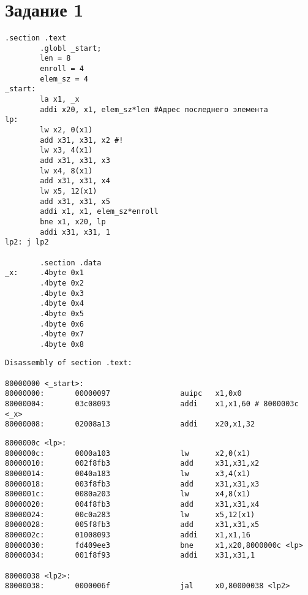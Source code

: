 \chapter{Задание 1}
\label{cha:design}

\begin{lstlisting}[label=code:source_1, caption=Листинг исходной программы]
        .section .text
        .globl _start;
        len = 8 
        enroll = 4
		elem_sz = 4
_start:
        la x1, _x
        addi x20, x1, elem_sz*len #Адрес последнего элемента
lp:
        lw x2, 0(x1)
        add x31, x31, x2 #!
        lw x3, 4(x1)
        add x31, x31, x3
        lw x4, 8(x1)
        add x31, x31, x4
        lw x5, 12(x1)
        add x31, x31, x5
        addi x1, x1, elem_sz*enroll
        bne x1, x20, lp
        addi x31, x31, 1
lp2: j lp2

        .section .data
_x:     .4byte 0x1
        .4byte 0x2
        .4byte 0x3
        .4byte 0x4
        .4byte 0x5
        .4byte 0x6
        .4byte 0x7
        .4byte 0x8
\end{lstlisting}

\begin{lstlisting}[label=code:source_21, caption=Деассемблированный листинг исходной программы]
Disassembly of section .text:

80000000 <_start>:
80000000:       00000097                auipc   x1,0x0
80000004:       03c08093                addi    x1,x1,60 # 8000003c <_x>
80000008:       02008a13                addi    x20,x1,32
\end{lstlisting}
\begin{lstlisting}[label=code:source_22, caption=Продолжение листинга \ref{code:source_21}]
8000000c <lp>:
8000000c:       0000a103                lw      x2,0(x1)
80000010:       002f8fb3                add     x31,x31,x2
80000014:       0040a183                lw      x3,4(x1)
80000018:       003f8fb3                add     x31,x31,x3
8000001c:       0080a203                lw      x4,8(x1)
80000020:       004f8fb3                add     x31,x31,x4
80000024:       00c0a283                lw      x5,12(x1)
80000028:       005f8fb3                add     x31,x31,x5
8000002c:       01008093                addi    x1,x1,16
80000030:       fd409ee3                bne     x1,x20,8000000c <lp>
80000034:       001f8f93                addi    x31,x31,1

80000038 <lp2>:
80000038:       0000006f                jal     x0,80000038 <lp2>
\end{lstlisting}


